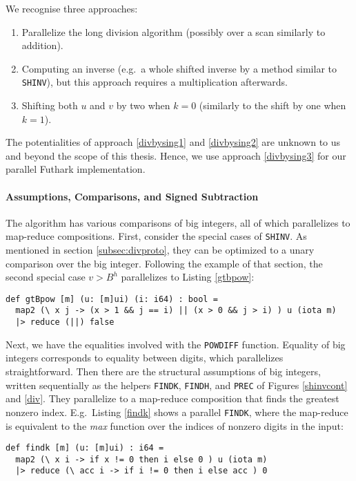 We recognise three approaches:
\begin{enumerate}
\item Parallelize the long division algorithm (possibly over a scan similarly to
  addition).\label{divbysing1}
\item Computing an inverse (e.g.\ a whole shifted inverse by a method similar to
  \texttt{SHINV}), but this approach requires a multiplication
  afterwards.\label{divbysing2}
\item Shifting both $u$ and $v$ by two when $k = 0$ (similarly to the shift by
  one when $k=1$).\label{divbysing3}
\end{enumerate}

The potentialities of approach \ref{divbysing1} and \ref{divbysing2} are unknown
to us and beyond the scope of this thesis. Hence, we use approach
\ref{divbysing3} for our parallel Futhark implementation.

\paragraph{Assumptions, Comparisons, and Signed Subtraction}
The algorithm has various comparisons of big integers, all of which
parallelizes to map-reduce compositions. First, consider the special cases of
\texttt{SHINV}. As mentioned in section \ref{subsec:divproto}, they can be
optimized to a unary comparison over the big integer. Following the example of
that section, the second special case $v > B^h$ parallelizes to Listing
\ref{gtbpow}:
\begin{lstlisting}[language=futhark,caption={\footnotesize Futhark function to check $u > B^i$ in parallel for big integer $u$ in base $B$ from file \texttt{div.fut}.},label={gtbpow},firstnumber=29]
def gtBpow [m] (u: [m]ui) (i: i64) : bool =
  map2 (\ x j -> (x > 1 && j == i) || (x > 0 && j > i) ) u (iota m)
  |> reduce (||) false
\end{lstlisting}
Next, we have the equalities involved with the \texttt{POWDIFF}
function. Equality of big integers corresponds to equality between digits, which
parallelizes straightforward. Then there are the structural assumptions of big
integers, written sequentially as the helpers \texttt{FINDK}, \texttt{FINDH},
and \texttt{PREC} of Figures \ref{shinvcont} and \ref{div}. They parallelize to a map-reduce
composition that finds the greatest nonzero index. E.g.\ Listing \ref{findk}
shows a parallel \texttt{FINDK}, where the map-reduce is equivalent to the
\textit{max} function over the indices of nonzero digits in the input:
\begin{lstlisting}[language=futhark,caption={\footnotesize Futhark function to find $i$ for big integer $u$ in base $B$ s.t.\ $B^i \leq u < B^{i+1}$ from file \texttt{div.fut}.},label={findk},firstnumber=39]
def findk [m] (u: [m]ui) : i64 =
  map2 (\ x i -> if x != 0 then i else 0 ) u (iota m)
  |> reduce (\ acc i -> if i != 0 then i else acc ) 0
\end{lstlisting}

